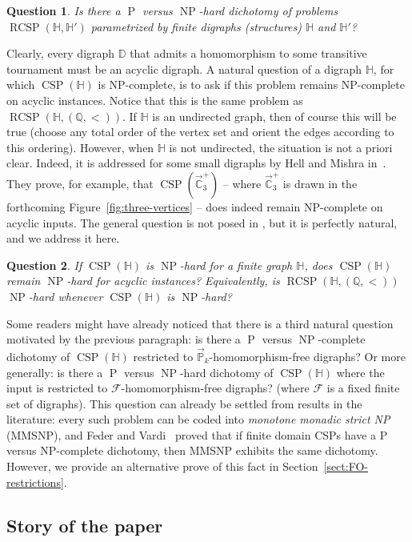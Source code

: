\documentclass{article}
\newtheorem{question}{Question}
\theoremstyle{definition}
\theoremstyle{remark}
\DeclareMathOperator{\NP}{NP}
\DeclareMathOperator{\cP}{P}
\DeclareMathOperator{\CSP}{CSP}
\DeclareMathOperator{\RCSP}{RCSP}
\newcommand{\bC}{{\mathbb C}}
\newcommand{\bD}{{\mathbb D}}
\newcommand{\bH}{{\mathbb H}}
\newcommand{\bP}{{\mathbb P}}
\newcommand{\bQ}{{\mathbb Q}}
\newcommand{\calF}{{\mathcal F}}
\begin{document}
\begin{question}\label{qst:RCSP}
    Is there a $\cP$ versus $\NP$-hard dichotomy of problems $\RCSP(\bH,\bH')$
    parametrized by finite digraphs (structures) $\bH$ and $\bH'$?
\end{question}


Clearly, every digraph $\bD$ that admits a homomorphism to some transitive tournament must be
an acyclic digraph. A natural question of a digraph $\bH$, for which $\CSP(\bH)$ is NP-complete,
is to ask if this problem remains NP-complete on acyclic instances. Notice that
this is the same problem as $\RCSP(\bH,(\bQ,<))$. If $\bH$ is an undirected graph,
then of course this will be true (choose any total order of the vertex set and orient the edges 
according to this ordering). However, when $\bH$ is not undirected, the situation is not a priori clear.
Indeed, it is addressed for some small digraphs by Hell and Mishra in~\cite{HM14}. They prove,
for example, that $\CSP({\vec \bC_3^+})$ -- where ${\vec \bC_3^+}$ is drawn in the forthcoming
Figure~\ref{fig:three-vertices} -- does indeed remain NP-complete on acyclic inputs. The general
question is not posed in \cite{HM14}, but it is perfectly natural, and we address it here.

\begin{question}\label{qst:acyclic}
    If $\CSP(\bH)$ is $\NP$-hard for a finite graph $\bH$, does 
    $\CSP(\bH)$ remain $\NP$-hard for acyclic instances? Equivalently, is
    $\RCSP(\bH,(\bQ,<))$ $\NP$-hard whenever $\CSP(\bH)$ is $\NP$-hard?
\end{question}

Some readers might have already noticed that there is a third natural question
motivated by the previous paragraph: is there a $\cP$ versus $\NP$-complete
dichotomy of $\CSP(\bH)$ restricted to $\vec{\bP}_k$-homomorphism-free digraphs?
Or more generally: is there a $\cP$ versus $\NP$-hard dichotomy of $\CSP(\bH)$
where the input is restricted to $\calF$-homomorphism-free digraphs?
(where $\calF$ is a fixed finite set of digraphs). This question can already
be settled from results in the literature: every such problem 
can be coded into \emph{monotone monadic strict NP} (MMSNP), and Feder and 
Vardi~\cite{FederVardi} proved that if finite domain CSPs have a P versus NP-complete
dichotomy, then MMSNP exhibits the same dichotomy. However, we provide an
alternative prove of this fact in Section~\ref{sect:FO-restrictions}.


\subsection*{Story of the paper}
\end{document}
